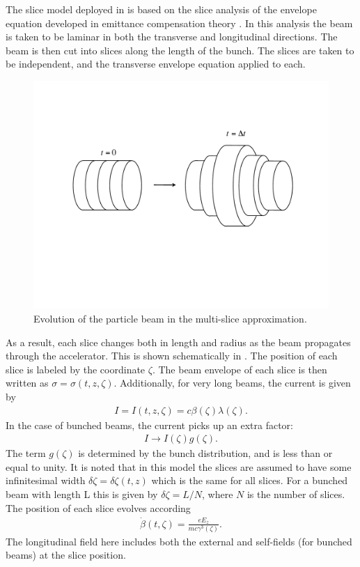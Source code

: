 The slice model deployed in \opalenv is based on the slice analysis of the
envelope equation developed in emittance compensation theory \cite{bib:JBong}.
In this analysis the beam is taken to be laminar in both the transverse and
longitudinal directions. The beam is then cut into slices along the length of
the bunch. The slices are taken to be independent, and the transverse envelope
equation applied to each.
%
\begin{figure}[h]
  \begin{center}
        \includegraphics[width=120mm]{figures/HomdynPlots1}
        \caption{Evolution of the particle beam in the multi-slice approximation.}
    \label{fig:sliceModel}
  \end{center}
\end{figure}
%
As a result, each slice changes both in length and radius as the beam
propagates through the accelerator. This is shown schematically in
. The position of each slice is labeled by the
coordinate $\zeta$. The beam envelope of each slice is then written as
$\sigma = \sigma(t,z,\zeta)$.
Additionally, for very long beams, the current is given by
%
\begin{eqnarray}
I = I(t,z,\zeta) = c\beta(\zeta)\lambda(\zeta).
\end{eqnarray}
%
In the case of bunched beams, the current picks up an extra factor:
%
\begin{eqnarray}
I\rightarrow I(\zeta)g(\zeta).  \label{eq:FormFact}
\end{eqnarray}
%
The term $g(\zeta)$ is determined by the bunch distribution, and is less than or
equal to unity. It is noted that in this model the slices are assumed to have
some infinitesimal width $\delta\zeta = \delta\zeta(t,z)$ which is the same
for all slices. For a bunched beam with length L this is given by $\delta\zeta
= L/N$, where $N$ is the number of slices. The position of each slice evolves
according
%
\begin{eqnarray}
\dot\beta(t,\zeta) = \frac{eE_z}{mc\gamma^3(\zeta)}.
\end{eqnarray}
%
The longitudinal field here includes both the external and self-fields (for
bunched beams) at the slice position.

